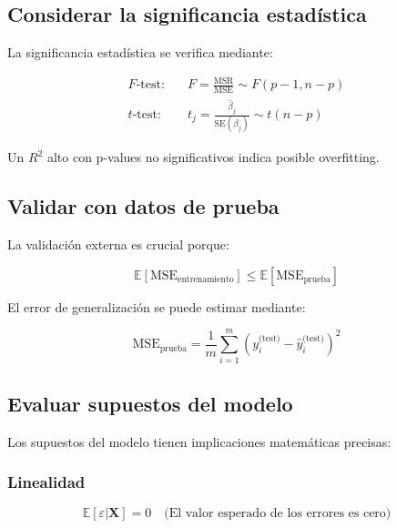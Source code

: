 \documentclass[12pt]{article}
\begin{document}

\subsection{Considerar la significancia estadística}

La significancia estadística se verifica mediante:

\begin{align*}
F\text{-test:} &\quad F = \frac{\text{MSR}}{\text{MSE}} \sim F(p-1, n-p) \\
t\text{-test:} &\quad t_j = \frac{\hat{\beta}_j}{\text{SE}(\hat{\beta}_j)} \sim t(n-p)
\end{align*}

Un $R^2$ alto con p-values no significativos indica posible overfitting.

\subsection{Validar con datos de prueba}

La validación externa es crucial porque:

\[
\mathbb{E}[\text{MSE}_{\text{entrenamiento}}] \leq \mathbb{E}[\text{MSE}_{\text{prueba}}]
\]

El error de generalización se puede estimar mediante:

\[
\text{MSE}_{\text{prueba}} = \frac{1}{m}\sum_{i=1}^m (y_i^{\text{(test)}} - \hat{y}_i^{\text{(test)}})^2
\]

\subsection{Evaluar supuestos del modelo}

Los supuestos del modelo tienen implicaciones matemáticas precisas:

\subsubsection{Linealidad}
\[
\mathbb{E}[\varepsilon|\mathbf{X}] = 0 \quad \text{(El valor esperado de los errores es cero)}
\]
\end{document}
